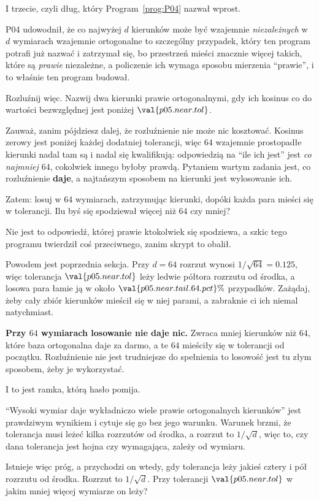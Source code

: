 \begin{fr}
I trzecie, czyli dług, który Program~\ref{prog:P04} nazwał wprost.

P04 udowodnił, że co najwyżej $d$ kierunków może być wzajemnie
\emph{niezależnych} w $d$ wymiarach \dash{} wzajemnie ortogonalne to szczególny
przypadek, który ten program potrafi już nazwać \dash{} i zatrzymał się, bo
przestrzeń mieści znacznie więcej takich, które są \emph{prawie} niezależne, a
policzenie ich wymaga sposobu mierzenia \enquote{prawie}, i to właśnie ten
program budował.

Rozluźnij więc. Nazwij dwa kierunki prawie ortogonalnymi, gdy ich kosinus co do
wartości bezwzględnej jest poniżej $\val{p05.near.tol}$.

Zauważ, zanim pójdziesz dalej, że rozluźnienie nie może nic kosztować. Kosinus
zerowy jest poniżej każdej dodatniej tolerancji, więc $64$ wzajemnie
prostopadłe kierunki nadal tam są i nadal się kwalifikują: odpowiedzią na
\enquote{ile ich jest} jest \emph{co najmniej $64$}, cokolwiek innego byłoby
prawdą. Pytaniem wartym zadania jest, co rozluźnienie \textbf{daje}, a
najtańszym sposobem na kierunki jest wylosowanie ich.

Zatem: losuj w $64$ wymiarach, zatrzymując kierunki, dopóki każda para mieści
się w tolerancji. Ilu byś się spodziewał \dash{} więcej niż $64$ czy mniej?
\nextframe
\end{fr}

\begin{fr}
Nie jest to odpowiedź, której prawie ktokolwiek się spodziewa, a szkic tego
programu twierdził coś przeciwnego, zanim skrypt to obalił.

Powodem jest poprzednia sekcja. Przy $d = 64$ rozrzut wynosi
$1/\sqrt{64} = \num{0.125}$, więc tolerancja $\val{p05.near.tol}$ leży ledwie
półtora rozrzutu od środka, a losowa para łamie ją w około
$\val{p05.near.tail.64.pct}\%$ przypadków. Zażądaj, żeby cały zbiór kierunków
mieścił się w niej parami, a zabraknie ci ich niemal natychmiast.

\textbf{Przy $64$ wymiarach losowanie nie daje nic.} Zwraca mniej kierunków
niż $64$, które baza ortogonalna daje za darmo, a te $64$ mieściły się w
tolerancji od początku. Rozluźnienie nie jest trudniejsze do spełnienia
\dash{} to losowość jest tu złym sposobem, żeby je wykorzystać.
\end{fr}

\begin{fr}
I to jest ramka, którą hasło pomija.

\enquote{Wysoki wymiar daje wykładniczo wiele prawie ortogonalnych kierunków}
jest prawdziwym wynikiem i cytuje się go bez jego warunku. Warunek brzmi, że
tolerancja musi leżeć kilka rozrzutów od środka, a rozrzut to $1/\sqrt{d}$,
więc to, czy dana tolerancja jest hojna czy wymagająca, zależy od wymiaru.

Istnieje więc próg, a przychodzi on wtedy, gdy tolerancja leży jakieś cztery i
pół rozrzutu od środka. Rozrzut to $1/\sqrt{d}$. Przy tolerancji
$\val{p05.near.tol}$ w jakim mniej więcej wymiarze on leży?
\nextframe
\end{fr}

